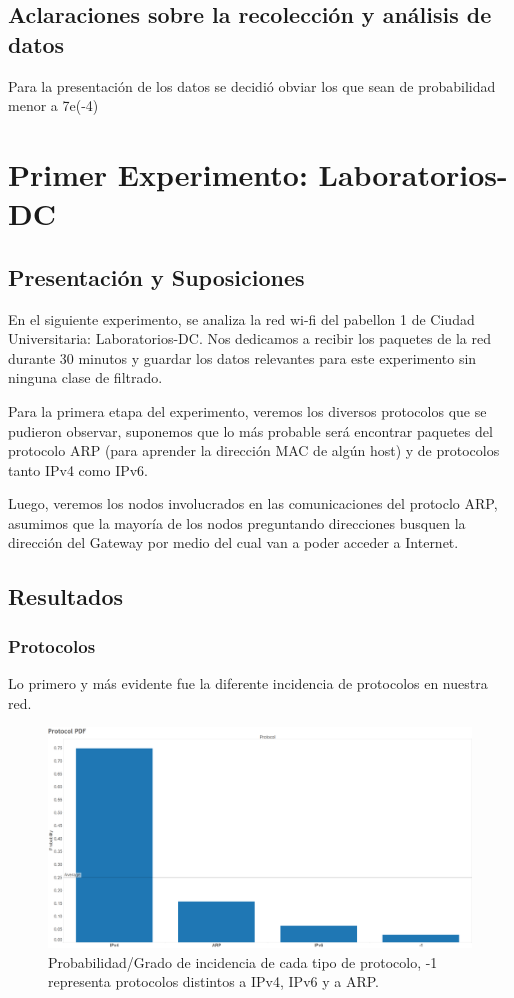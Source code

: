 \documentclass{article}
\theoremstyle{definition}
\theoremstyle{remark}
\begin{document}
\subsection{Aclaraciones sobre la recolección y análisis de datos}
Para la presentación de los datos se decidió obviar los que sean de probabilidad menor a 7e(-4)


\newpage
\section{Primer Experimento: Laboratorios-DC}

\subsection{Presentación y Suposiciones}

En el siguiente experimento, se analiza la red wi-fi del pabellon 1 de Ciudad Universitaria: Laboratorios-DC. Nos dedicamos a recibir los paquetes de la red durante 30 minutos y guardar los datos relevantes para este experimento sin ninguna clase de filtrado.

Para la primera etapa del experimento, veremos los diversos protocolos que se pudieron observar, suponemos que lo más probable será encontrar paquetes del protocolo ARP (para aprender la dirección MAC de algún host) y de protocolos tanto IPv4 como IPv6.

Luego, veremos los nodos involucrados en las comunicaciones del protoclo ARP, asumimos que la mayoría de los nodos preguntando direcciones busquen la dirección del Gateway por medio del cual van a poder acceder a Internet.

\subsection{Resultados}

\subsubsection{Protocolos}

Lo primero y más evidente fue la diferente incidencia de protocolos en nuestra red.

\begin{figure}[H]
\centering
\includegraphics[width=450pt]{captures/LabosDC/Protocol PDF Dashboard Probabilitidad.png}
\caption{Probabilidad/Grado de incidencia de cada tipo de protocolo, -1 representa protocolos distintos a IPv4, IPv6 y a ARP.}
\end{figure}
\end{document}
